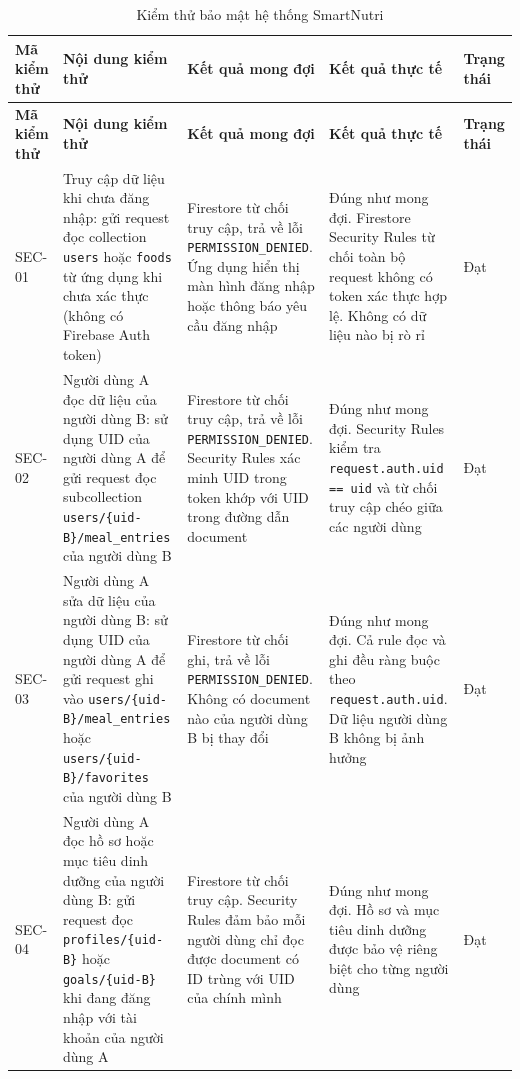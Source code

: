 \begingroup
\small
\begin{longtable}{|p{1.8cm}|p{4.5cm}|p{4cm}|p{3cm}|p{1.5cm}|}
    \caption{Kiểm thử bảo mật hệ thống SmartNutri}
    \label{tab:security_test} \\
    \hline
    \textbf{Mã kiểm thử} & \textbf{Nội dung kiểm thử} & \textbf{Kết quả mong đợi} & \textbf{Kết quả thực tế} & \textbf{Trạng thái} \\
    \hline
    \endfirsthead
    \hline
    \textbf{Mã kiểm thử} & \textbf{Nội dung kiểm thử} & \textbf{Kết quả mong đợi} & \textbf{Kết quả thực tế} & \textbf{Trạng thái} \\
    \hline
    \endhead
    \hline
    \endfoot
    SEC-01 & Truy cập dữ liệu khi chưa đăng nhập: gửi request đọc collection \texttt{users} hoặc \texttt{foods} từ ứng dụng khi chưa xác thực (không có Firebase Auth token) & Firestore từ chối truy cập, trả về lỗi \texttt{PERMISSION\_DENIED}. Ứng dụng hiển thị màn hình đăng nhập hoặc thông báo yêu cầu đăng nhập & Đúng như mong đợi. Firestore Security Rules từ chối toàn bộ request không có token xác thực hợp lệ. Không có dữ liệu nào bị rò rỉ & Đạt \\
    \hline
    SEC-02 & Người dùng A đọc dữ liệu của người dùng B: sử dụng UID của người dùng A để gửi request đọc subcollection \texttt{users/\{uid-B\}/meal\_entries} của người dùng B & Firestore từ chối truy cập, trả về lỗi \texttt{PERMISSION\_DENIED}. Security Rules xác minh UID trong token khớp với UID trong đường dẫn document & Đúng như mong đợi. Security Rules kiểm tra \texttt{request.auth.uid == uid} và từ chối truy cập chéo giữa các người dùng & Đạt \\
    \hline
    SEC-03 & Người dùng A sửa dữ liệu của người dùng B: sử dụng UID của người dùng A để gửi request ghi vào \texttt{users/\{uid-B\}/meal\_entries} hoặc \texttt{users/\{uid-B\}/favorites} của người dùng B & Firestore từ chối ghi, trả về lỗi \texttt{PERMISSION\_DENIED}. Không có document nào của người dùng B bị thay đổi & Đúng như mong đợi. Cả rule đọc và ghi đều ràng buộc theo \texttt{request.auth.uid}. Dữ liệu người dùng B không bị ảnh hưởng & Đạt \\
    \hline
    SEC-04 & Người dùng A đọc hồ sơ hoặc mục tiêu dinh dưỡng của người dùng B: gửi request đọc \texttt{profiles/\{uid-B\}} hoặc \texttt{goals/\{uid-B\}} khi đang đăng nhập với tài khoản của người dùng A & Firestore từ chối truy cập. Security Rules đảm bảo mỗi người dùng chỉ đọc được document có ID trùng với UID của chính mình & Đúng như mong đợi. Hồ sơ và mục tiêu dinh dưỡng được bảo vệ riêng biệt cho từng người dùng & Đạt \\

\end{longtable}
